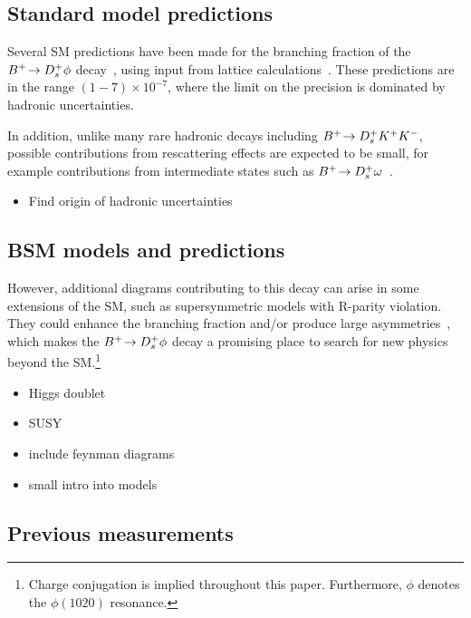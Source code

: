 \subsection{Standard model predictions}
{\color{Blue}
Several SM predictions have been made for the branching fraction of the ${{{B}^+}}\!\rightarrow {\ensuremath{{D}^+_{s}}}\phi$ decay~\cite{Zou:2009zza, Mohanta:2002wf, Mohanta:2007uu, Lu:2001yz}, using input from lattice calculations~\cite{fB:2013HPQCD,fB:2016ETM, fB:2016Fermi}. These predictions are in the range $(1-7)\times10^{-7}$, where the limit on the precision is dominated by hadronic uncertainties. 

In addition, unlike many rare hadronic decays including ${{{B}^+}}\!\rightarrow {\ensuremath{{D}^+_{s}}}{\ensuremath{{K}^+}}{\ensuremath{{K}^-}}$, possible contributions from rescattering effects are expected to be small, for example contributions from intermediate states such as ${{{B}^+}}\!\rightarrow {\ensuremath{{D}^+_{s}}}\omega$~\cite{Gronau:2012gs}.

}

{\color{Red}
\begin{itemize}
\item Find origin of hadronic uncertainties 
\end{itemize}}

\subsection{BSM models and predictions}
{\color{Blue}
However, additional diagrams contributing to this decay can arise in some extensions of the SM, such as supersymmetric models with R-parity 
violation. They could enhance the branching fraction and/or produce large \CP asymmetries~\cite{Mohanta:2002wf, Mohanta:2007uu}, which makes the ${{{B}^+}}\!\rightarrow {\ensuremath{{D}^+_{s}}}\phi$ decay a promising place to search for new physics beyond the SM.\footnote{Charge conjugation is implied throughout this paper. Furthermore, $\phi$ denotes the $\phi(1020)$ resonance.}
}

{\color{Red}
\begin{itemize}
\item Higgs doublet
\item SUSY 
\item include feynman diagrams
\item small intro into models
\end{itemize}}

\subsection{Previous measurements}

